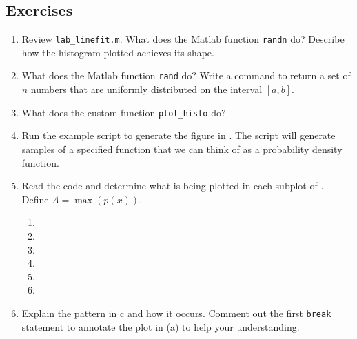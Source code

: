 \documentclass[11pt,titlepage,fleqn]{article}
\newcommand{\vertgap}{\vspace{1cm}}
\begin{document}




\pagebreak
\subsection*{Exercises}

\begin{enumerate}
\item Review \verb+lab_linefit.m+. What does the Matlab function \verb+randn+ do? Describe how the histogram plotted achieves its shape.

\vertgap

\item What does the Matlab function \verb+rand+ do? Write a command to return a set of $n$ numbers that are uniformly distributed on the interval $[a,b]$.

\vertgap

\item What does the custom function \verb+plot_histo+ do?

\vertgap

\item Run the example script to generate the figure in . The script will generate samples of a specified function that we can think of as a probability density function.

\item Read the code and determine what is being plotted in each subplot of . \\
Define $A = \max(p(x))$.
%
\begin{spacing}{2.0}
\begin{enumerate}
\item 
\item 
\item 
\item 
\item 
\item 
\end{enumerate}
\end{spacing}

\item Explain the pattern in c and how it occurs. Comment out the first \verb+break+ statement to annotate the plot in (a) to help your understanding.


\end{enumerate}
\end{document}
